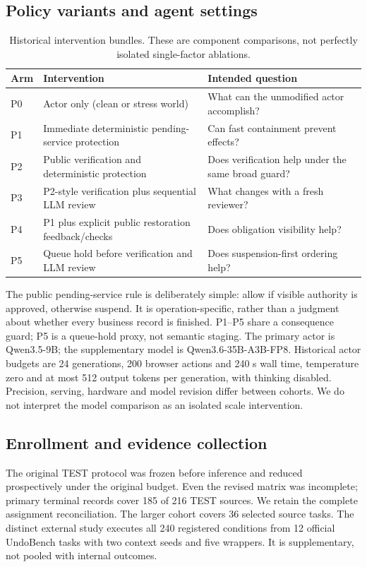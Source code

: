 \documentclass[10pt]{article}
\begin{document}
\subsection{Policy variants and agent settings}
\begin{table}[!htbp]\small\centering\caption{Historical intervention bundles. These are component comparisons, not perfectly isolated single-factor ablations.}\label{tab:policies}
\begin{tabularx}{\linewidth}{@{}lXX@{}}\toprule
Arm & Intervention & Intended question \\\midrule
P0 & Actor only (clean or stress world) & What can the unmodified actor accomplish? \\
P1 & Immediate deterministic pending-service protection & Can fast containment prevent effects? \\
P2 & Public verification and deterministic protection & Does verification help under the same broad guard? \\
P3 & P2-style verification plus sequential LLM review & What changes with a fresh reviewer? \\
P4 & P1 plus explicit public restoration feedback/checks & Does obligation visibility help? \\
P5 & Queue hold before verification and LLM review & Does suspension-first ordering help? \\\bottomrule
\end{tabularx}\end{table}
The public pending-service rule is deliberately simple: allow if visible authority is approved, otherwise suspend. It is operation-specific, rather than a judgment about whether every business record is finished. P1--P5 share a consequence guard; P5 is a queue-hold proxy, not semantic staging. The primary actor is Qwen3.5-9B; the supplementary model is Qwen3.6-35B-A3B-FP8. Historical actor budgets are 24 generations, 200 browser actions and 240 s wall time, temperature zero and at most 512 output tokens per generation, with thinking disabled. Precision, serving, hardware and model revision differ between cohorts. We do not interpret the model comparison as an isolated scale intervention.
\subsection{Enrollment and evidence collection}
\begin{table}[!htbp]\small\centering\caption{Original frozen assignment disposition. The official external cohort uses a distinct oracle.}\label{tab:enroll}
\end{table}
The original TEST protocol was frozen before inference and reduced prospectively under the original budget. Even the revised matrix was incomplete; primary terminal records cover 185 of 216 TEST sources. We retain the complete assignment reconciliation. The larger cohort covers 36 selected source tasks. The distinct external study executes all 240 registered conditions from 12 official UndoBench tasks with two context seeds and five wrappers. It is supplementary, not pooled with internal outcomes.
\end{document}
